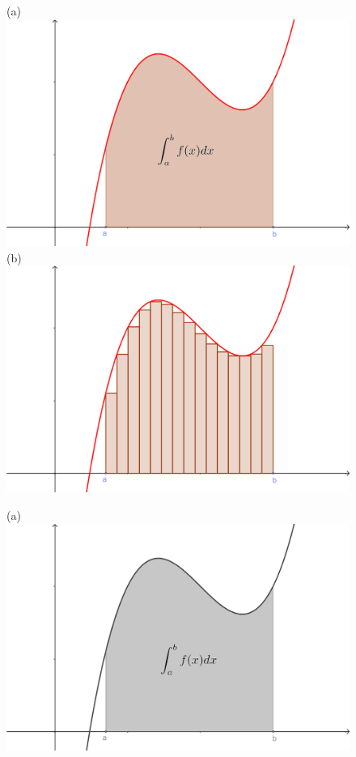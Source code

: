 \begin{figure}[hp]
\begin{center}
\begin{enColor}
(a)\\
\includegraphics[width=12cm]{../fig/Cap05-IntegralRectangulosSumaInferior.png}\\
(b)\\
\includegraphics[width=12cm]{../fig/Cap05-IntegralRectangulosSumaInferior-a.png}
\end{enColor}
\begin{bn}
(a)\\
\includegraphics[width=12cm]{../fig/Cap05-IntegralRectangulosSumaInferior-bn.png}\\

\end{bn}
\end{center}
\end{figure}
